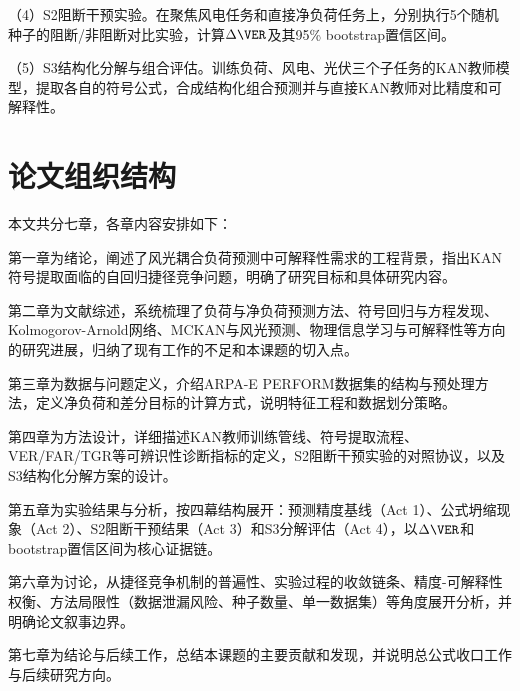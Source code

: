 （4）S2阻断干预实验。在聚焦风电任务和直接净负荷任务上，分别执行5个随机种子的阻断/非阻断对比实验，计算$\Delta\VER$及其95\% bootstrap置信区间。

（5）S3结构化分解与组合评估。训练负荷、风电、光伏三个子任务的KAN教师模型，提取各自的符号公式，合成结构化组合预测并与直接KAN教师对比精度和可解释性。

\section{论文组织结构}

本文共分七章，各章内容安排如下：

第一章为绪论，阐述了风光耦合负荷预测中可解释性需求的工程背景，指出KAN符号提取面临的自回归捷径竞争问题，明确了研究目标和具体研究内容。

第二章为文献综述，系统梳理了负荷与净负荷预测方法、符号回归与方程发现、Kolmogorov-Arnold网络、MCKAN与风光预测、物理信息学习与可解释性等方向的研究进展，归纳了现有工作的不足和本课题的切入点。

第三章为数据与问题定义，介绍ARPA-E PERFORM数据集的结构与预处理方法，定义净负荷和差分目标的计算方式，说明特征工程和数据划分策略。

第四章为方法设计，详细描述KAN教师训练管线、符号提取流程、VER/FAR/TGR等可辨识性诊断指标的定义，S2阻断干预实验的对照协议，以及S3结构化分解方案的设计。

第五章为实验结果与分析，按四幕结构展开：预测精度基线（Act 1）、公式坍缩现象（Act 2）、S2阻断干预结果（Act 3）和S3分解评估（Act 4），以$\Delta\VER$和bootstrap置信区间为核心证据链。

第六章为讨论，从捷径竞争机制的普遍性、实验过程的收敛链条、精度-可解释性权衡、方法局限性（数据泄漏风险、种子数量、单一数据集）等角度展开分析，并明确论文叙事边界。

第七章为结论与后续工作，总结本课题的主要贡献和发现，并说明总公式收口工作与后续研究方向。
